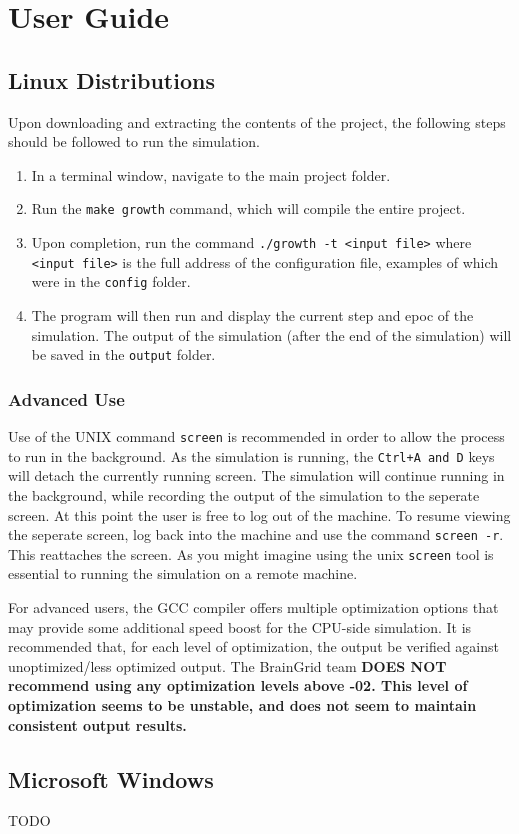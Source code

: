 \section{User Guide}
\subsection{Linux Distributions}
\mdseries Upon downloading and extracting the contents of the project, the following steps should be followed to run the simulation.
\begin{enumerate}
	\item	In a terminal window, navigate to the main project folder. 
	\item Run the \verb|make growth| command, which will compile the entire project.
	\item Upon completion, run the command \verb|./growth -t <input file>| where \verb|<input file>| is the full address of the configuration file, examples of which were in the \verb|config| folder.
	\item The program will then run and display the current step and epoc of the simulation. The output of the simulation (after the end of the simulation) will be saved in the \verb|output| folder. 
\end{enumerate}
\subsubsection{Advanced Use}
\mdseries Use of the UNIX command \verb|screen| is recommended in order to allow the process to run in the background. As the simulation is running, the \verb|Ctrl+A and D| keys will detach the currently running screen. The simulation will continue running in the background, while recording the output of the simulation to the seperate screen. At this point the user is free to log out of the machine.  To resume viewing the seperate screen, log back into the machine and use the command \verb|screen -r|.  This reattaches the screen.  As you might imagine using the unix \verb|screen| tool is essential to running the simulation on a remote machine. 

\noindent \mdseries For advanced users, the GCC compiler offers multiple optimization options that may provide some additional speed boost for the CPU-side simulation. It is recommended that, for each level of optimization, the output be verified against unoptimized/less optimized output. The BrainGrid team \bfseries DOES NOT \mdseries recommend using any optimization levels above -02. This level of optimization seems to be unstable, and does not seem to maintain consistent output results.   

\subsection{Microsoft Windows}
TODO
\pagebreak
